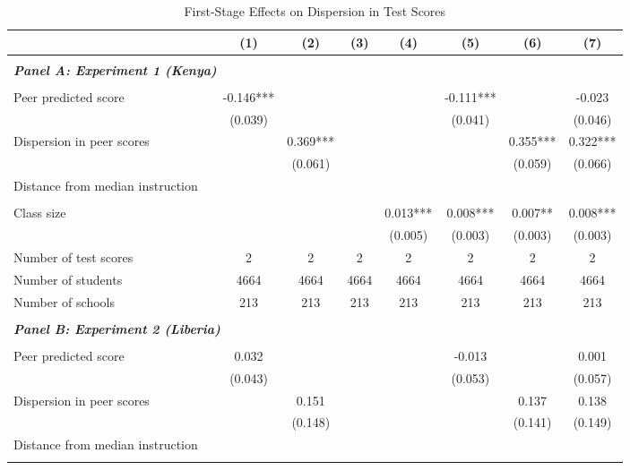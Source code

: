 \begin{table}[H]
\centering
\caption{\small First-Stage Effects on Dispersion in Test Scores}
\label{tab:dispersion_firststage}
\begin{scriptsize}
\begin{threeparttable}
\begin{tabular} {@{} l l c c c c c c c  @{}} \toprule \toprule
& &(1)&(2)&(3)&(4)&(5)&(6)&(7) \\ \midrule
\\
\multicolumn{3}{l}{\textbf{\textit{Panel A: Experiment 1 (Kenya)}}} \\
\\
Peer predicted score &  & -0.146*** &  &  &  & -0.111*** &  & -0.023 \\
                 &  & (0.039) &  &  &  & (0.041) &  & (0.046) \\
Dispersion in peer scores &  &  & 0.369*** &  &  &  & 0.355*** & 0.322*** \\
                 &  &  & (0.061) &  &  &  & (0.059) & (0.066) \\
Distance from median instruction &  &  &  &  &  &  &  &  \\
                 &  &  &  &  &  &  &  &  \\
Class size &  &  &  &  & 0.013*** & 0.008*** & 0.007** & 0.008*** \\
                 &  &  &  &  & (0.005) & (0.003) & (0.003) & (0.003) \\
\midrule
Number of test scores &  & 2 & 2 & 2 & 2 & 2 & 2 & 2 \\
Number of students &  & 4664 & 4664 & 4664 & 4664 & 4664 & 4664 & 4664 \\
Number of schools &  & 213 & 213 & 213 & 213 & 213 & 213 & 213 \\
 \midrule
\\
\multicolumn{3}{l}{\textbf{\textit{Panel B: Experiment 2 (Liberia)}}} \\
\\
Peer predicted score &  & 0.032 &  &  &  & -0.013 &  & 0.001 \\
                 &  & (0.043) &  &  &  & (0.053) &  & (0.057) \\
Dispersion in peer scores &  &  & 0.151 &  &  &  & 0.137 & 0.138 \\
                 &  &  & (0.148) &  &  &  & (0.141) & (0.149) \\
Distance from median instruction &  &  &  &  &  &  &  &  \\
                 &  &  &  &  &  &  &  &  \\

\end{tabular}
\end{threeparttable}
\end{scriptsize}
\end{table}
